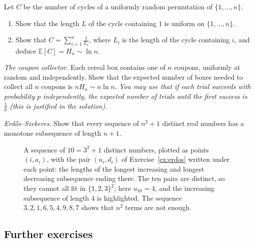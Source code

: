 \begin{exercise}[$\star\star$]\label{ex:cycles}
Let $C$ be the number of cycles of a uniformly random permutation of $\{1,\dots,n\}$.
\begin{enumerate}[label=(\alph*)]
\item Show that the length $L$ of the cycle containing $1$ is uniform on $\{1,\dots,n\}$.
\item Show that $C=\sum_{i=1}^n\frac1{L_i}$, where $L_i$ is the length of the cycle containing $i$, and deduce $\mathbb E[C]=H_n\sim\ln n$.
\end{enumerate}
\end{exercise}

\begin{exercise}[$\star\star\star$]\label{ex:coupon}
\emph{The coupon collector.} Each cereal box contains one of $n$ coupons, uniformly at random and independently. Show that the expected number of boxes needed to collect all $n$
coupons is $nH_n\sim n\ln n$. \emph{You may use that if each trial succeeds with probability $p$ independently, the expected number of trials until the first success is $\frac1p$ (this is justified in the solution).}
\end{exercise}

\begin{exercise}[$\star\star\star$]\label{ex:erdos}
\emph{Erd\H{o}s--Szekeres.} Show that every sequence of $n^2+1$ distinct real numbers has a monotone subsequence of length $n+1$.
\end{exercise}

\begin{figure}[ht]
\centering
{}
\caption{A sequence of $10=3^2+1$ distinct numbers, plotted as points $(i,a_i)$, with the pair $(u_i,d_i)$ of Exercise~\ref{ex:erdos} written under each point: the lengths of the longest increasing and longest decreasing subsequence ending there. The ten pairs are distinct, so they cannot all fit in $\{1,2,3\}^2$; here $u_{10}=4$, and the increasing subsequence of length $4$ is highlighted. The sequence $3,2,1,6,5,4,9,8,7$ shows that $n^2$ terms are not enough.}
\label{fig:erdos}
\end{figure}

\subsection*{Further exercises}

